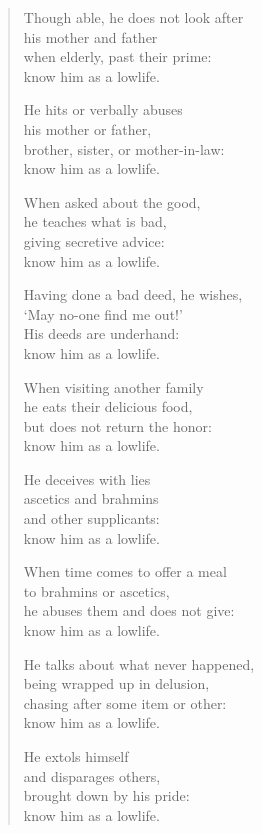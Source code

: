 \documentclass[12pt,openany]{book}%
\begin{document}
\begin{verse}
Though able, he does not look after \\
his mother and father \\
when elderly, past their prime: \\
know him as a lowlife. 

He hits or verbally abuses \\
his mother or father, \\
brother, sister, or mother-in-law: \\
know him as a lowlife. 

When asked about the good, \\
he teaches what is bad, \\
giving secretive advice: \\
know him as a lowlife. 

Having done a bad deed, he wishes, \\
‘May no-one find me out!’ \\
His deeds are underhand: \\
know him as a lowlife. 

When visiting another family \\
he eats their delicious food, \\
but does not return the honor: \\
know him as a lowlife. 

He deceives with lies \\
ascetics and brahmins \\
and other supplicants: \\
know him as a lowlife. 

When time comes to offer a meal \\
to brahmins or ascetics, \\
he abuses them and does not give: \\
know him as a lowlife. 

He talks about what never happened, \\
being wrapped up in delusion, \\
chasing after some item or other: \\
know him as a lowlife. 

He extols himself \\
and disparages others, \\
brought down by his pride: \\
know him as a lowlife. 


\end{verse}
\end{document}
